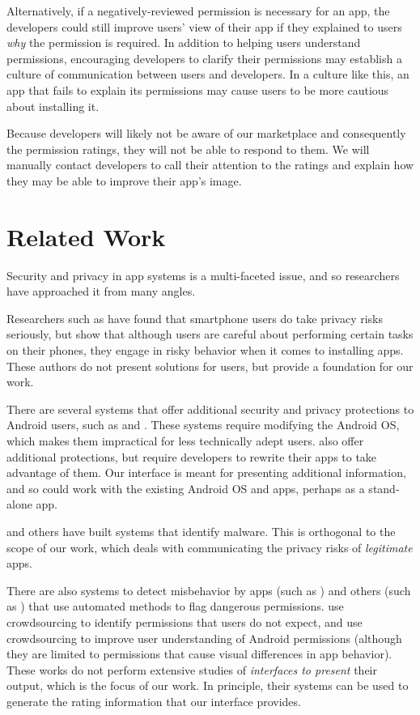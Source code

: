\documentclass[11pt]{article}
\begin{document}
Alternatively, if a negatively-reviewed permission is necessary for
an app, the developers could still improve users' view of their app
if they explained to users \emph{why} the permission is required. In 
addition to helping users understand permissions, encouraging developers 
to clarify their permissions may establish a culture of communication
between users and developers. In a culture like this, an app that fails
to explain its permissions may cause users to be more cautious about 
installing it. 

Because developers will likely not be aware of our marketplace and 
consequently the permission ratings, they will not be able to respond 
to them. We will manually contact developers to call their attention
to the ratings and explain how they may be able to improve their 
app's image.


\section{Related Work}

Security and privacy in app systems is a multi-faceted issue, and 
so researchers have approached it from many angles.

Researchers such as \citet{99-problems-SPSM12} have found 
that smartphone users do take privacy risks seriously, but
\citet{smartphone-user-conf-SOUPS12} show that although
users are careful about
performing certain tasks on their phones, they engage in risky behavior
when it comes to installing apps. These
authors do not present solutions for users, but 
provide a foundation for our work.

There are several systems that offer additional 
security and privacy protections to Android users, such as 
\citet{mockDroid-HOTMOBILE11} and \citet{TISSA-Trust11}. 
These systems require modifying
the Android OS, which makes them impractical
for less technically adept users. 
\citet{dr-android-hide-SPSM12} also offer additional
protections, but require developers to rewrite their
apps to take advantage of them.
Our interface is meant
for presenting additional information, and so could work
with the existing Android OS and apps, perhaps as a stand-alone app.

\citet{android-repackaged-CODASPY12} and others have
built systems that identify
malware. This is orthogonal to the scope of our work, which
deals with communicating the privacy risks of \emph{legitimate} apps.

There are also systems to detect misbehavior by apps (such as
\citet{taintDroid-OSDI10})
and others (such as \citet{droidrisk-2013}) that use
automated methods to flag dangerous permissions.
\citet{expect-purpose-UbiComp12}
use crowdsourcing to identify permissions that users do not expect,
and \citet{droidganger-SPSM12} use crowdsourcing to improve user 
understanding of Android permissions (although they are limited
to permissions that cause visual differences in app behavior). 
These works do not perform
extensive studies of \emph{interfaces to present} their output, which
is the focus of our work. In principle, their systems can be used to
generate the rating information that our interface provides.
\end{document}
